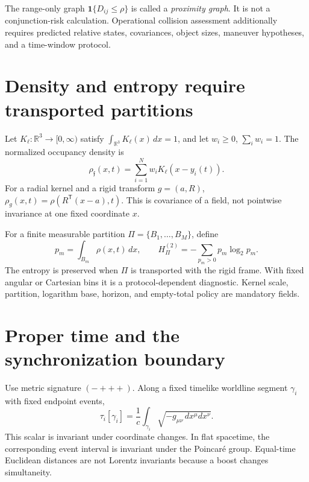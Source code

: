 \documentclass[11pt,a4paper]{article}
\theoremstyle{definition}
\theoremstyle{plain}
\theoremstyle{remark}
\newcommand{\R}{\mathbb{R}}
\begin{document}
The range-only graph
\(\bm1\{D_{ij}\le\rho\}\) is called a \emph{proximity graph}.
It is not a conjunction-risk calculation.  Operational collision
assessment additionally requires predicted relative states,
covariances, object sizes, maneuver hypotheses, and a time-window
protocol.

\section{Density and entropy require transported partitions}

Let \(K_\ell:\R^3\to[0,\infty)\) satisfy
\(\int_{\R^3}K_\ell(x)\,dx=1\), and let
\(w_i\ge0\), \(\sum_iw_i=1\).  The normalized occupancy density is
\begin{equation}\label{eq:density}
\rho_{\mathfrak f}(x,t)
=\sum_{i=1}^Nw_iK_\ell(x-y_i(t)).
\end{equation}
For a radial kernel and a rigid transform \(g=(a,R)\),
\(\rho_g(x,t)=\rho(R^\mathsf T(x-a),t)\).  This is covariance of a
field, not pointwise invariance at one fixed coordinate \(x\).

For a finite measurable partition
\(\Pi=\{B_1,\ldots,B_M\}\), define
\[
p_m=\int_{B_m}\rho(x,t)\,dx,\qquad
H_\Pi^{(2)}=-\sum_{p_m>0}p_m\log_2p_m .
\]
The entropy is preserved when \(\Pi\) is transported with the rigid
frame.  With fixed angular or Cartesian bins it is a
protocol-dependent diagnostic.  Kernel scale, partition, logarithm
base, horizon, and empty-total policy are mandatory fields.

\section{Proper time and the synchronization boundary}

Use metric signature \((-+++)\).  Along a fixed timelike worldline
segment \(\gamma_i\) with fixed endpoint events,
\begin{equation}\label{eq:proper-time}
\tau_i[\gamma_i]
=\frac1c\int_{\gamma_i}
\sqrt{-g_{\mu\nu}\,dx^\mu dx^\nu}.
\end{equation}
This scalar is invariant under coordinate changes.  In flat
spacetime, the corresponding event interval is invariant under the
Poincar\'e group.  Equal-time Euclidean distances are not Lorentz
invariants because a boost changes simultaneity.
\end{document}
